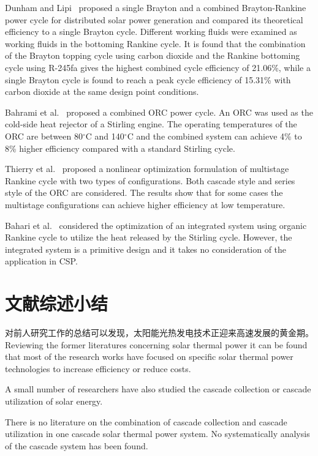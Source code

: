 Dunham and Lipi~\cite{Dunham2013} proposed a single Brayton and a combined Brayton-Rankine power cycle for distributed solar power generation and compared its theoretical efficiency to a single Brayton cycle. Different working fluids were examined as working fluids in the bottoming Rankine cycle. It is found that the combination of the Brayton topping cycle using carbon dioxide and the Rankine bottoming cycle using R-245fa gives the highest combined cycle efficiency of 21.06\%, while a single Brayton cycle is found to reach a peak cycle efficiency of 15.31\% with carbon dioxide at the same design point conditions. 

Bahrami et al.~\cite{Bahrami2013} proposed a combined ORC power cycle. An ORC was used as the cold-side heat rejector of a Stirling engine. The operating temperatures of the ORC are between 80$\mathrm{^\circ C}$ and 140$\mathrm{^\circ C}$ and the combined system can achieve 4\% to 8\% higher efficiency compared with a standard Stirling cycle.

Thierry et al.~\cite{Thierry2016} proposed a nonlinear optimization formulation of multistage Rankine cycle with two types of configurations. Both cascade style and series style of the ORC are considered. The results show that for some cases the multistage configurations can achieve higher efficiency at low temperature.

Bahari et al.~\cite{Bahari2016} considered the optimization of an integrated system using organic Rankine cycle to utilize the heat released by the Stirling cycle. However, the integrated system is a primitive design and it takes no consideration of the application in CSP.


\section{文献综述小结}
对前人研究工作的总结可以发现，太阳能光热发电技术正迎来高速发展的黄金期。
Reviewing the former literatures concerning solar thermal power it can be found that most of the research works have focused on specific solar thermal power technologies to increase efficiency or reduce costs. 

A small number of researchers have also studied the cascade collection or cascade utilization of solar energy. 

There is no literature on the combination of cascade collection and cascade utilization in one cascade solar thermal power system. No systematically analysis of the cascade system has been found.

